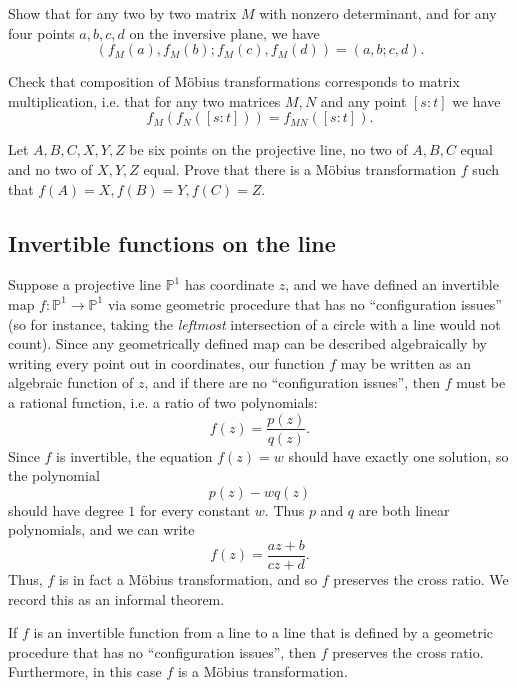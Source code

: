 \begin{exer} Show that for any two by two matrix $M$ with nonzero determinant, and for any four points $a,b,c,d$ on the inversive plane, we have
\[
(f_M(a),f_M(b);f_M(c),f_M(d)) = (a,b;c,d).
\]
\end{exer}

\begin{exer} Check that composition of M\"obius transformations corresponds to matrix multiplication, i.e. that for any two matrices $M,N$ and any point $[s:t]$ we have
\[
f_M(f_N([s:t])) = f_{MN}([s:t]).
\]
\end{exer}

\begin{exer} Let $A,B,C,X,Y,Z$ be six points on the projective line, no two of $A,B,C$ equal and no two of $X,Y,Z$ equal. Prove that there is a M\"obius transformation $f$ such that $f(A) = X, f(B) = Y, f(C) = Z$.
\end{exer}

\subsection{Invertible functions on the line}

Suppose a projective line $\mathbb{P}^1$ has coordinate $z$, and we have defined an invertible map $f:\mathbb{P}^1 \rightarrow \mathbb{P}^1$ via some geometric procedure that has no ``configuration issues'' (so for instance, taking the \emph{leftmost} intersection of a circle with a line would not count). Since any geometrically defined map can be described algebraically by writing every point out in coordinates, our function $f$ may be written as an algebraic function of $z$, and if there are no ``configuration issues'', then $f$ must be a rational function, i.e. a ratio of two polynomials:
\[
f(z) = \frac{p(z)}{q(z)}.
\]
Since $f$ is invertible, the equation $f(z) = w$ should have exactly one solution, so the polynomial
\[
p(z) - wq(z)
\]
should have degree $1$ for every constant $w$. Thus $p$ and $q$ are both linear polynomials, and we can write
\[
f(z) = \frac{az+b}{cz+d}.
\]
Thus, $f$ is in fact a M\"obius transformation, and so $f$ preserves the cross ratio. We record this as an informal theorem.

\begin{thm}\label{invariant} If $f$ is an invertible function from a line to a line that is defined by a geometric procedure that has no ``configuration issues'', then $f$ preserves the cross ratio. Furthermore, in this case $f$ is a M\"obius transformation.
\end{thm}

